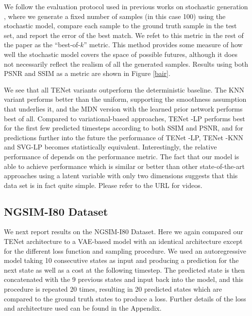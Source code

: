 \documentclass{article}
\newcommand{\modelname}{TENet }
\begin{document}
We follow the evaluation protocol used in previous works on stochastic generation \citep{Walker2016, Babaeizadeh2018, Denton2018}, where we generate a fixed number of samples (in this case 100) using the stochastic model, compare each sample to the ground truth sample in the test set, and report the error of the best match. We refet to this metric in the rest of the paper as the ``best-of-$k$'' metric.
This method provides some measure of how well the stochastic model covers the space of possible futures, although it does not necessarily reflect the realism of all the generated samples.
Results using both PSNR and SSIM \citep{SSIM} as a metric are shown in Figure \ref{bair}.

We see that all \modelname variants outperform the deterministic baseline.
The KNN variant performs better than the uniform, supporting the smoothness assumption that underlies it, and the MDN version with the learned prior network performs best of all.
Compared to variational-based approaches, \modelname-LP performs best for the first few predicted timesteps according to both SSIM and PSNR, and for predictions further into the future the performance of \modelname-LP, \modelname-KNN and SVG-LP becomes statistically equivalent.  Interestingly, the relative performance of \citep{Babaeizadeh2018} depends on the performance metric.
The fact that our model is able to achieve performance which is similar or better than other state-of-the-art approaches using a latent variable with only two dimensions suggests that this data set is in fact quite simple.
Please refer to the URL for videos.


\subsection{NGSIM-I80 Dataset}

We next report results on the NGSIM-I80 Dataset. Here we again compared our \modelname architecture to a VAE-based model with an identical architecture except for the different loss function and sampling procedure.
We used an autoregressive model taking 10 consecutive states as input and producing a prediction for the next state as well as a cost at the following timestep.
The predicted state is then concatenated with the 9 previous states and input back into the model, and this procedure is repeated 20 times, resulting in 20 predicted states which are compared to the ground truth states to produce a loss. Further details of the loss and architecture used can be found in the Appendix.
\end{document}
